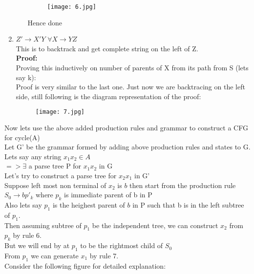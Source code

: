 \documentclass{article}
\begin{document}
\begin{enumerate}
\begin{itemize}
            
            \begin{figure}[H]
                \centering
                \texttt{[image: 6.jpg]}
            \end{figure}
        
        Hence done
    \end{itemize}

    \item $Z' \rightarrow X'Y$ $\forall X \rightarrow YZ$\\
    This is to backtrack and get complete string on the left of Z.\\
    \textbf{Proof: }\\
    Proving this inductively on number of parents of X from its path from S (lets say k):\\
    Proof is very similar to the last one. Just now we are backtracing on the left side, still following is the diagram representation of the proof:\\

    \begin{figure}[H]
        \centering
        \texttt{[image: 7.jpg]}
    \end{figure}

\end{enumerate}

Now lets use the above added production rules and grammar to construct a CFG for cycle(A)\\
Let G' be the grammar formed by adding above production rules and states to G.\\

Lets say any string $x_1x_2 \in A$\\
$=> \exists $ a parse tree P for $x_1x_2$ in G\\
Let's try to construct a parse tree for $x_2x_1$ in G'\\
Suppose left most non terminal of $x_2$ is $b$ then start from the production rule $S_0 \rightarrow bp'_k $ where $p_k $ is immediate parent of b in P\\
Also lets say $p_1$ is the heighest parent of $b$ in P such that b is in the left subtree of $p_1$.\\
Then assuming subtree of $p_1$ be the independent tree, we can construct $x_2$ from $p_k$ by rule 6.\\
But we will end by at $p_1$ to be the rightmost child of $S_0$\\
From $p_1$ we can generate $x_1$ by rule 7.\\
Consider the following figure for detailed explanation:\\
\end{document}
